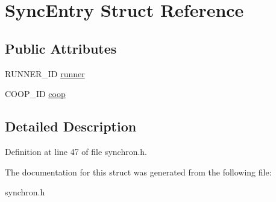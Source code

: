 \hypertarget{structSyncEntry}{
\section{Sync\-Entry Struct Reference}
\label{structSyncEntry}
}
\subsection*{Public Attributes}
\begin{CompactItemize}
\item 
\hypertarget{structSyncEntry_4a41a06c6c4325831c08d086812d6374}{
RUNNER\_\-ID \hyperlink{structSyncEntry_4a41a06c6c4325831c08d086812d6374}{runner}}
\label{structSyncEntry_4a41a06c6c4325831c08d086812d6374}

\item 
\hypertarget{structSyncEntry_145d9df059f130c90766acf6635dba3b}{
COOP\_\-ID \hyperlink{structSyncEntry_145d9df059f130c90766acf6635dba3b}{coop}}
\label{structSyncEntry_145d9df059f130c90766acf6635dba3b}

\end{CompactItemize}


\subsection{Detailed Description}




Definition at line 47 of file synchron.h.

The documentation for this struct was generated from the following file:\begin{CompactItemize}
\item 
synchron.h\end{CompactItemize}
